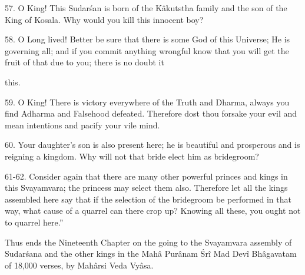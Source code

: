 57. O King! This Sudar\'san is born of the K\^akutstha family and the son of the King of Kosala. Why would you kill this innocent boy?

58. O Long lived! Better be sure that there is some God of this Universe; He is governing all; and if you commit anything wrongful know that you will get the fruit of that due to you; there is no doubt it

this.

59. O King! There is victory everywhere of the Truth and Dharma, always you find Adharma and Falsehood defeated. Therefore dost thou forsake your evil and mean intentions and pacify your vile mind.

60. Your daughter's son is also present here; he is beautiful and prosperous and is reigning a kingdom. Why will not that bride elect him as bridegroom?

61-62. Consider again that there are many other powerful princes and kings in this Svayamvara; the princess may select them also. Therefore let all the kings assembled here say that if the selection of the bridegroom be performed in that way, what cause of a quarrel can there crop up? Knowing all these, you ought not to quarrel here.''

Thus ends the Nineteenth Chapter on the going to the Svayamvara assembly of Sudar\'sana and the other kings in the Mah\^a Pur\^anam \'Sr\^i Mad Dev\^i Bh\^agavatam of 18,000 verses, by Mah\^arsi Veda Vy\^asa.